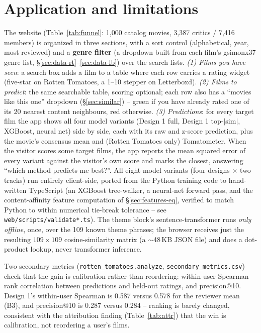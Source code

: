 \documentclass[11pt]{article}
\begin{document}
\section{Application and limitations}
\label{sec:app-limits}

The website (Table~\ref{tab:funnel}: 1{,}000 catalog movies, 3{,}387 critics / 7{,}416 members) is organized in three sections, with a sort control (alphabetical, year, most-reviewed) and a \textbf{genre filter} (a dropdown built from each film's gsimonx37 genre list, \S\ref{sec:data-rt}--\ref{sec:data-lb}) over the search lists. \emph{(1) Films you have seen}: a search box adds a film to a table where each row carries a rating widget (five-star on Rotten Tomatoes, a 1--10 stepper on Letterboxd). \emph{(2) Films to predict}: the same searchable table, scoring optional; each row also has a ``movies like this one'' dropdown (\S\ref{sec:similar}) -- green if you have already rated one of its 20 nearest content neighbours, red otherwise. \emph{(3) Predictions}: for every target film the app shows all four model variants (Design 1 full, Design 1 top-$|$sim$|$, XGBoost, neural net) side by side, each with its raw and z-score prediction, plus the movie's consensus mean and (Rotten Tomatoes only) Tomatometer. When the visitor scores some target films, the app reports the mean squared error of every variant against the visitor's own score and marks the closest, answering ``which method predicts me best?''. All eight model variants (four designs $\times$ two tracks) run entirely client-side, ported from the Python training code to hand-written TypeScript (an XGBoost tree-walker, a neural-net forward pass, and the content-affinity feature computation of \S\ref{sec:features-eq}, verified to match Python to within numerical tie-break tolerance -- see \texttt{web/scripts/validate*.ts}). The theme block's sentence-transformer runs \emph{only offline}, once, over the 109 known theme phrases; the browser receives just the resulting $109\times109$ cosine-similarity matrix (a $\sim$48\,KB JSON file) and does a dot-product lookup, never transformer inference.

Two secondary metrics (\texttt{rotten\_tomatoes.analyze}, \texttt{secondary\_metrics.csv}) check that the gain is calibration rather than reordering: within-user Spearman rank correlation between predictions and held-out ratings, and precision@10. Design 1's within-user Spearman is 0.587 versus 0.578 for the reviewer mean (B3), and precision@10 is 0.287 versus 0.284 -- ranking is barely changed, consistent with the attribution finding (Table~\ref{tab:attr}) that the win is calibration, not reordering a user's films.
\end{document}
